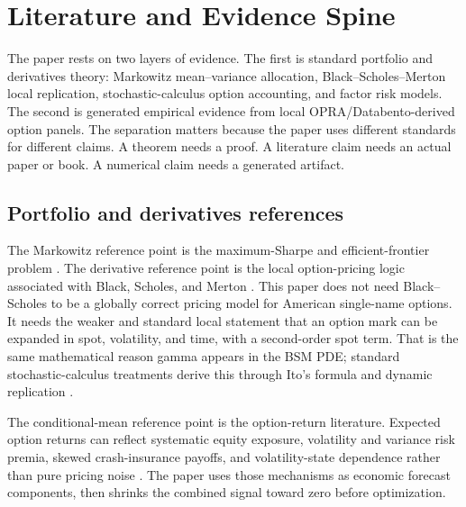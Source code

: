 \section{Literature and Evidence Spine}

The paper rests on two layers of evidence. The first is standard portfolio and derivatives
theory: Markowitz mean--variance allocation, Black--Scholes--Merton local replication,
stochastic-calculus option accounting, and factor risk models. The second is generated
empirical evidence from local OPRA/Databento-derived option panels. The separation matters
because the paper uses different standards for different claims. A theorem needs a proof.
A literature claim needs an actual paper or book. A numerical claim needs a generated
artifact.

\subsection{Portfolio and derivatives references}

The Markowitz reference point is the maximum-Sharpe and efficient-frontier problem
\citep{markowitz1952portfolio}. The derivative reference point is the local option-pricing
logic associated with Black, Scholes, and Merton
\citep{blackscholes1973,merton1973}. This paper does not need Black--Scholes to be a
globally correct pricing model for American single-name options. It needs the weaker and
standard local statement that an option mark can be expanded in spot, volatility, and time,
with a second-order spot term. That is the same mathematical reason gamma appears in the
BSM PDE; standard stochastic-calculus treatments derive this through Ito's formula and
dynamic replication \citep{shreve2004stochasticii}.

The conditional-mean reference point is the option-return literature. Expected option
returns can reflect systematic equity exposure, volatility and variance risk premia,
skewed crash-insurance payoffs, and volatility-state dependence rather than pure pricing
noise \citep{coval_shumway2001,bakshi_kapadia2003,carr_wu2009,
bollerslev_tauchen_zhou2009,broadie_chernov_johannes2009}.  The paper uses those
mechanisms as economic forecast components, then shrinks the combined signal toward zero
before optimization.

